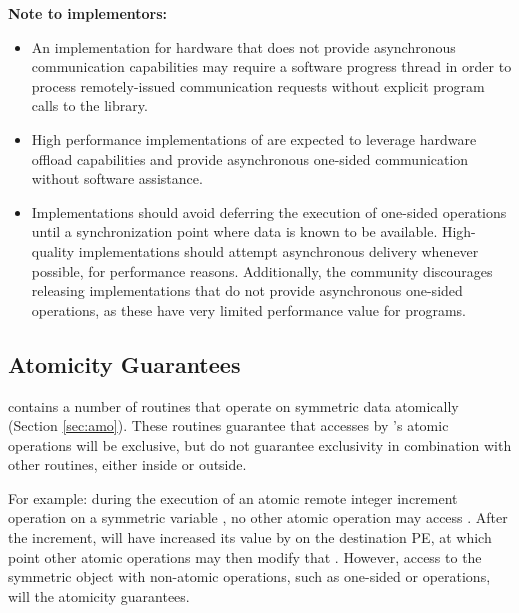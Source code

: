 \textbf{Note to implementors:}
\begin{itemize}
  \item An \openshmem implementation for hardware that does not provide
      asynchronous communication capabilities may require a software progress
      thread in order to process remotely-issued communication requests without
      explicit program calls to the \openshmem library.  
  \item High performance implementations of \openshmem are expected to leverage
      hardware offload capabilities and provide asynchronous one-sided
      communication without software assistance.
  \item Implementations should avoid deferring the execution of one-sided
      operations until a synchronization point where data is known to be
      available. High-quality implementations should attempt asynchronous delivery
      whenever possible, for performance reasons. Additionally, the \openshmem
      community discourages releasing \openshmem implementations that do not
      provide asynchronous one-sided operations, as these have very limited
      performance value for \openshmem programs.
\end{itemize}

\subsection{Atomicity Guarantees}\label{sec:amo_guarantees}

\openshmem contains a number of routines that operate on symmetric data
atomically (Section \ref{sec:amo}).  These routines guarantee that accesses by
\openshmem's atomic operations will be exclusive, but do not guarantee
exclusivity in combination with other routines, either inside \openshmem or
outside.

For example: during the execution of an atomic remote integer increment
operation on a symmetric variable , no other \openshmem atomic operation
may access .  After the increment,  will have increased its value
by  on the destination \ac{PE}, at which point other atomic operations
may then modify that .  However, access to the symmetric object 
with non-atomic operations, such as one-sided \PUT or \GET operations, will
 the atomicity guarantees.
